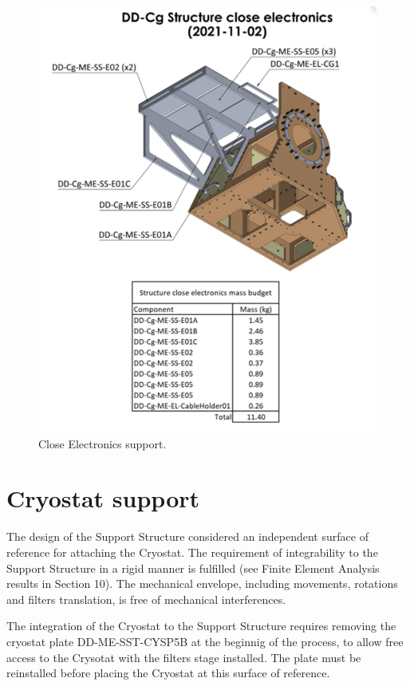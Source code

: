 \documentclass{report}
\begin{document}
\begin{figure}
\centering
\includegraphics[width=1\linewidth]{figures/SScloseelec.png}
\caption{Close Electronics support.}
\label{figure:SScloseelec}
\end{figure}

\clearpage

\section{Cryostat support}

The design of the Support Structure considered an independent surface of reference for attaching the Cryostat. The requirement of integrability to the Support Structure in a rigid manner is fulfilled (see Finite Element Analysis results in Section 10). The mechanical envelope, including movements, rotations and filters translation, is free of mechanical interferences.

The integration of the Cryostat to the Support Structure requires removing the cryostat plate DD-ME-SST-CYSP5B at the beginnig of the process, to allow free access to the Crysotat with the filters stage installed. The plate must be reinstalled before placing the Cryostat at this surface of reference.
\end{document}
